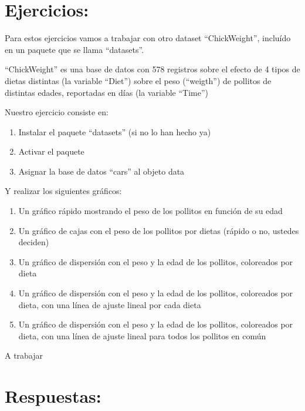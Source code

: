 \documentclass[
]{book}
\begin{document}
\hypertarget{ejercicios-4}{%
\section{\texorpdfstring{ Ejercicios:}{ Ejercicios:}}\label{ejercicios-4}}

Para estos ejercicios vamos a trabajar con otro dataset ``ChickWeight'', incluído en un paquete que se llama ``datasets''.

``ChickWeight'' es una base de datos con 578 registros sobre el efecto de 4 tipos de dietas distintas (la variable ``Diet'') sobre el peso (``weigth'') de pollitos de distintas edades, reportadas en días (la variable ``Time'')

Nuestro ejercicio consiste en:

\begin{enumerate}
\def\labelenumi{\arabic{enumi}.}
\item
  Instalar el paquete ``datasets'' (si no lo han hecho ya)
\item
  Activar el paquete
\item
  Asignar la base de datos ``cars'' al objeto data
\end{enumerate}

Y realizar los siguientes gráficos:

\begin{enumerate}
\def\labelenumi{\arabic{enumi}.}
\setcounter{enumi}{3}
\item
  Un gráfico rápido mostrando el peso de los pollitos en función de su edad
\item
  Un gráfico de cajas con el peso de los pollitos por dietas (rápido o no, ustedes deciden)
\item
  Un gráfico de dispersión con el peso y la edad de los pollitos, coloreados por dieta
\item
  Un gráfico de dispersión con el peso y la edad de los pollitos, coloreados por dieta, con una línea de ajuste lineal por cada dieta
\item
  Un gráfico de dispersión con el peso y la edad de los pollitos, coloreados por dieta, con una línea de ajuste lineal para todos los pollitos en común
\end{enumerate}

A trabajar

\hypertarget{respuestas-2}{%
\section{\texorpdfstring{ Respuestas:}{ Respuestas:}}\label{respuestas-2}}
\end{document}
